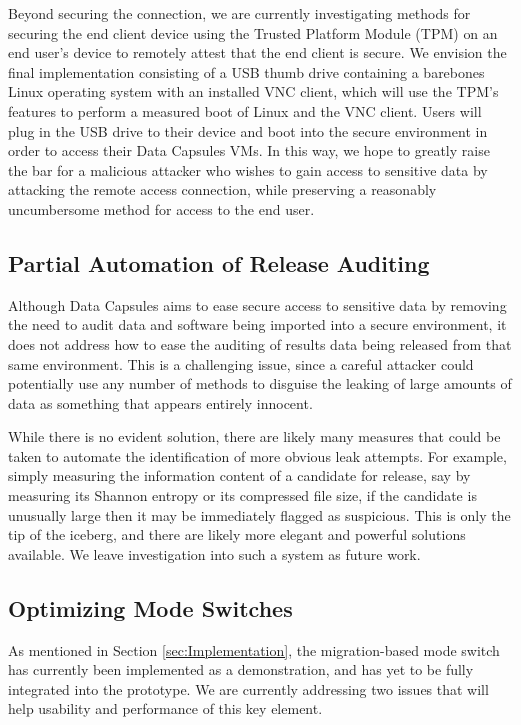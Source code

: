 \documentclass{acm_proc_article-sp}
\begin{document}
Beyond securing the connection, we are currently investigating methods for
securing the end client device using the Trusted Platform Module (TPM)
\cite{tpm} on an end user's device to remotely attest that the end client is
secure.  We envision the final implementation consisting of a USB thumb drive
containing a barebones Linux operating system with an installed VNC client,
which will use the TPM's features to perform a measured boot of Linux and the
VNC client.  Users will plug in the USB drive to their device and boot into the
secure environment in order to access their Data Capsules VMs.  In this way, we
hope to greatly raise the bar for a malicious attacker who wishes to gain
access to sensitive data by attacking the remote access connection, while
preserving a reasonably uncumbersome method for access to the end user.

\subsection{Partial Automation of Release Auditing}
\label{sec:Results Audit}

Although Data Capsules aims to ease secure access to sensitive data by removing
the need to audit data and software being imported into a secure environment,
it does not address how to ease the auditing of results data being released
from that same environment.  This is a challenging issue, since a careful
attacker could potentially use any number of methods to disguise the leaking of
large amounts of data as something that appears entirely innocent.

While there is no evident solution, there are likely many measures that could be
taken to automate the identification of more obvious leak attempts.  For
example, simply measuring the information content of a candidate for release,
say by measuring its Shannon entropy or its compressed file size, if the
candidate is unusually large then it may be immediately flagged as suspicious.
This is only the tip of the iceberg, and there are likely more elegant and
powerful solutions available.  We leave investigation into such a system as
future work.

\subsection{Optimizing Mode Switches}

As mentioned in Section \ref{sec:Implementation}, the migration-based mode
switch has currently been implemented as a demonstration, and has yet to be
fully integrated into the prototype.  We are currently addressing two
issues that will help usability and performance of this key element.
\end{document}
